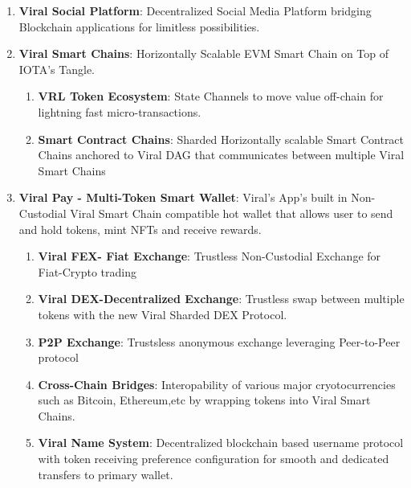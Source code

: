 \documentclass[conference]{IEEEtran}
\begin{document}
\begin{enumerate}[wide, labelwidth=!, labelindent=0pt]

\item \textbf{Viral Social Platform}: Decentralized Social Media Platform bridging Blockchain applications for limitless possibilities.

\item \textbf{Viral Smart Chains}: Horizontally Scalable EVM Smart Chain on Top of IOTA's Tangle.

\begin{enumerate}[wide, labelwidth=!, labelindent=0pt]

	\item \textbf{VRL Token Ecosystem}: State Channels to move value off-chain for lightning fast micro-transactions.

	\item \textbf{Smart Contract Chains}: Sharded Horizontally scalable Smart Contract Chains anchored to Viral DAG that communicates between multiple Viral Smart Chains

\end{enumerate}

\item \textbf{Viral Pay - Multi-Token Smart Wallet}: Viral's App's built in Non-Custodial Viral Smart Chain compatible hot wallet that allows user to send and hold tokens, mint NFTs and receive rewards.

\begin{enumerate}[wide, labelwidth=!, labelindent=0pt]

\item \textbf{Viral FEX- Fiat Exchange}: Trustless Non-Custodial Exchange for Fiat-Crypto trading
\item \textbf{Viral DEX-Decentralized Exchange}: Trustless swap between multiple tokens with the new Viral Sharded DEX Protocol.

\item \textbf{P2P Exchange}: Trustsless anonymous exchange leveraging Peer-to-Peer protocol

\item \textbf{Cross-Chain Bridges}: Interopability of various major cryotocurrencies such as Bitcoin, Ethereum,etc by wrapping tokens into Viral Smart Chains.

\item \textbf{Viral Name System}: Decentralized blockchain based username protocol with token receiving preference configuration for smooth and dedicated transfers to primary wallet.


\end{enumerate}
\end{enumerate}
\end{document}
